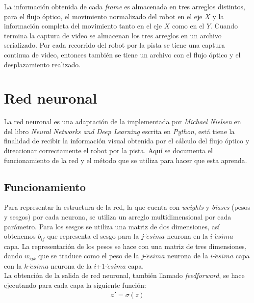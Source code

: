 \documentclass{iccmemoria}
\begin{document}
La información obtenida de cada \emph{frame} es almacenada en tres arreglos distintos, para el flujo óptico, el movimiento normalizado del robot en el eje $X$ y la información completa del movimiento tanto en el eje $X$ como en el $Y$. Cuando termina la captura de video se almacenan los tres arreglos en un archivo serializado. Por cada recorrido del robot por la pista se tiene una captura continua de video, entonces también se tiene un archivo con el flujo óptico y el desplazamiento realizado.\\

\section{Red neuronal}

La red neuronal es una adaptación de la implementada por \emph{Michael Nielsen} en del libro \emph{Neural Networks and Deep Learning} escrita en \emph{Python}\cite{NeuralNetworksAndDeepLearning}, está tiene la finalidad de recibir la información visual obtenida por el cálculo del flujo óptico y direccionar correctamente el robot por la pista. Aquí se documenta el funcionamiento de la red y el método que se utiliza para hacer que esta aprenda.\\

\subsection{Funcionamiento}
 
Para representar la estructura de la red, la que cuenta con \emph{weights} y \emph{biases} (pesos y sesgos) por cada neurona, se utiliza un arreglo multidimensional por cada parámetro. Para los sesgos se utiliza una matriz de dos dimensiones, así obtenemos $b_{ij}$ que representa el sesgo para la $j$-$\acute{e}sima$ neurona en la $i$-$\acute{e}sima$ capa. La representación de los pesos se hace con una matriz de tres dimensiones, dando $w_{ijk}$ que se traduce como el peso de la $j$-$\acute{e}sima$ neurona de la $i$-$\acute{e}sima$ capa con la $k$-$\acute{e}sima$ neurona de la $i$+$1$-$\acute{e}sima$ capa.\\
 
La obtención de la salida de red neuronal, también llamado \emph{feedforward}, se hace ejecutando para cada capa la siguiente función:\\

\begin{equation}
	\begin{split}
	a' = \sigma{(z)}\\
	\end{split}
\end{equation}\\
\end{document}
